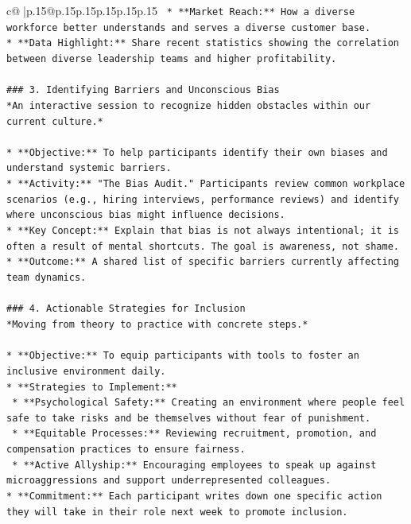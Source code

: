 \documentclass{article}
\begin{document}
{\begin{supertabular}{c@{$\;$}|p{.15\linewidth}@{}p{.15\linewidth}p{.15\linewidth}p{.15\linewidth}p{.15\linewidth}p{.15\linewidth}}
{{{\texttt{    *   **Market Reach:** How a diverse workforce better understands and serves a diverse customer base.} \\
\texttt{*   **Data Highlight:** Share recent statistics showing the correlation between diverse leadership teams and higher profitability.} \\
\\ 
\texttt{\#\#\# 3. Identifying Barriers and Unconscious Bias} \\
\texttt{*An interactive session to recognize hidden obstacles within our current culture.*} \\
\\ 
\texttt{*   **Objective:** To help participants identify their own biases and understand systemic barriers.} \\
\texttt{*   **Activity:** "The Bias Audit." Participants review common workplace scenarios (e.g., hiring interviews, performance reviews) and identify where unconscious bias might influence decisions.} \\
\texttt{*   **Key Concept:** Explain that bias is not always intentional; it is often a result of mental shortcuts. The goal is awareness, not shame.} \\
\texttt{*   **Outcome:** A shared list of specific barriers currently affecting team dynamics.} \\
\\ 
\texttt{\#\#\# 4. Actionable Strategies for Inclusion} \\
\texttt{*Moving from theory to practice with concrete steps.*} \\
\\ 
\texttt{*   **Objective:** To equip participants with tools to foster an inclusive environment daily.} \\
\texttt{*   **Strategies to Implement:**} \\
\texttt{    *   **Psychological Safety:** Creating an environment where people feel safe to take risks and be themselves without fear of punishment.} \\
\texttt{    *   **Equitable Processes:** Reviewing recruitment, promotion, and compensation practices to ensure fairness.} \\
\texttt{    *   **Active Allyship:** Encouraging employees to speak up against microaggressions and support underrepresented colleagues.} \\
\texttt{*   **Commitment:** Each participant writes down one specific action they will take in their role next week to promote inclusion.} \\
}}}
\end{supertabular}}
\end{document}
